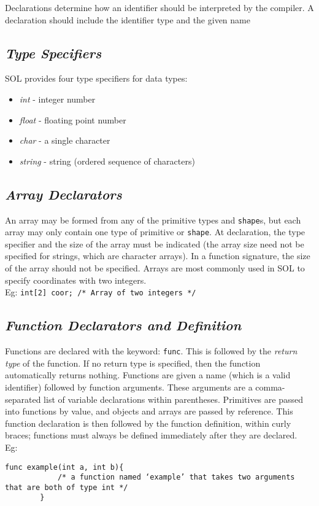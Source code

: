 \documentclass[letterpaper,12pt]{article}
\begin{document}
    Declarations determine how an identifier should be interpreted by the compiler. A declaration should include the identifier type and the given name

    \subsection{\textit{Type Specifiers}} \label{type}
    SOL provides four type specifiers for data types:
    \begin{itemize}
        \itemsep0em
        \item \textit{int} - integer number
        \item \textit{float} - floating point number
        \item \textit{char} - a single character
        \item \textit{string} - string (ordered sequence of characters)
    \end{itemize}

	\subsection{\textit{Array Declarators}} \label{array}
    An array may be formed from any of the primitive types and \texttt{shape}s, but each array may only contain one type of primitive or \texttt{shape}. At declaration, the type specifier and the size of the array must be indicated (the array size need not be specified for strings, which are character arrays). In a function signature, the size of the array should not be specified. Arrays are most commonly used in SOL to specify coordinates with two integers.\\
    Eg: \texttt{int[2] coor; /* Array of two integers */}

    \subsection{\textit{Function Declarators and Definition}}
    Functions are declared with the keyword: \texttt{func}. This is followed by the \textit{return type} of the function. If no return type is specified, then the function automatically returns nothing. Functions are given a name (which is a valid identifier) followed by function arguments. These arguments are a comma-separated list of variable declarations within parentheses. Primitives are passed into functions by value, and objects and arrays are passed by reference. This function declaration is then followed by the function definition, within curly braces; functions must always be defined immediately after they are declared.\\
    Eg: \begin{lstlisting}[aboveskip=-13pt]
        func example(int a, int b){
            /* a function named ‘example’ that takes two arguments that are both of type int */
        }
    \end{lstlisting}
\end{document}
